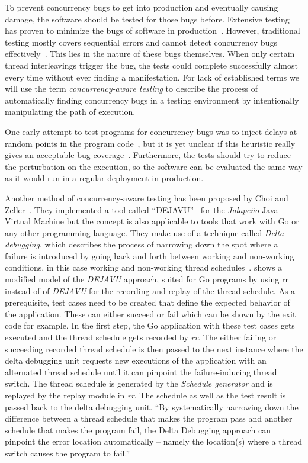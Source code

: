 \documentclass[conference]{IEEEtran}
\begin{document}
To prevent concurrency bugs to get into production and eventually causing damage, the software should be tested for those bugs before.
Extensive testing has proven to minimize the bugs of software in production~\cite{makinen2014testing}.
However, traditional testing mostly covers sequential errors and cannot detect concurrency bugs effectively~\cite{lu2008mistakes}.
This lies in the nature of these bugs themselves.
When only certain thread interleavings trigger the bug, the tests could complete successfully almost every time without ever finding a manifestation.
For lack of established terms we will use the term \emph{concurrency-aware testing} to describe the process of automatically finding concurrency bugs in a testing environment by intentionally manipulating the path of execution.

One early attempt to test programs for concurrency bugs was to inject delays at random points in the program code~\cite{bron2005coverage}, but it is yet unclear if this heuristic really gives an acceptable bug coverage~\cite{lu2008mistakes}.
Furthermore, the tests should try to reduce the perturbation on the execution, so the software can be evaluated the same way as it would run in a regular deployment in production.

Another method of concurrency-aware testing has been proposed by Choi and Zeller~\cite{acm2002}.
They implemented a tool called ``DEJAVU''~\cite{acm2002} for the \emph{Jalapeño} Java Virtual Machine but the concept is also applicable to tools that work with Go or any other programming language.
They make use of a technique called \emph{Delta debugging}, which describes the process of narrowing down the spot where a failure is introduced by going back and forth between working and non-working conditions, in this case working and non-working thread schedules~\cite{zeller2002delta}.
 shows a modified model of the \emph{DEJAVU} approach, suited for Go programs by using rr instead of of \emph{DEJAVU} for the recording and replay of the thread schedule.
As a prerequisite, test cases need to be created that define the expected behavior of the application.
These can either succeed or fail which can be shown by the exit code for example.
In the first step, the Go application with these test cases gets executed and the thread schedule gets recorded by \emph{rr}.
The either failing or succeeding recorded thread schedule is then passed to the next instance where the delta debugging unit requests new executions of the application with an alternated thread schedule until it can pinpoint the failure-inducing thread switch.
The thread schedule is generated by the \emph{Schedule generator} and is replayed by the replay module in \emph{rr}.
The schedule as well as the test result is passed back to the delta debugging unit.
``By systematically narrowing down the difference between a thread schedule that makes the program pass and another schedule that makes the program fail, the Delta Debugging approach can pinpoint the error location automatically -- namely the location(s) where a thread switch causes the program to fail.''~\cite{acm2002}
\end{document}

